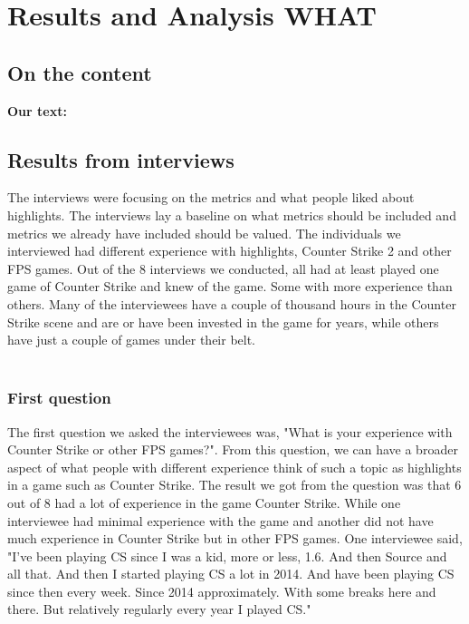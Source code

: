 \documentclass[a4paper,twoside]{bth}
\begin{document}
\chapter{Results and Analysis WHAT}
\label{chp:results}
\section{On the content}
\textbf{Our text:}\\
\section{Results from interviews}

The interviews were focusing on the metrics and what people liked about highlights. The interviews lay a baseline on what metrics should be included and metrics we already have included should be valued. The individuals we interviewed had different experience with highlights, Counter Strike 2 and other FPS games. Out of the 8 interviews we conducted, all had at least played one game of Counter Strike and knew of the game. Some with more experience than others. Many of the interviewees have a couple of thousand hours in the Counter Strike scene and are or have been invested in the game for years, while others have just a couple of games under their belt.\\\\
\subsection{First question}
The first question we asked the interviewees was, "What is your experience with Counter Strike or other FPS games?". From this question, we can have a broader aspect of what people with different experience think of such a topic as highlights in a game such as Counter Strike. The result we got from the question was that 6 out of 8 had a lot of experience in the game Counter Strike. While one interviewee had minimal experience with the game and another did not have much experience in Counter Strike but in other FPS games. One interviewee said, "I've been playing CS since I was a kid, more or less, 1.6. And then Source and all that. And then I started playing CS a lot in 2014. And have been playing CS since then every week. Since 2014 approximately. With some breaks here and there. But relatively regularly every year I played CS."\\\\
\end{document}
